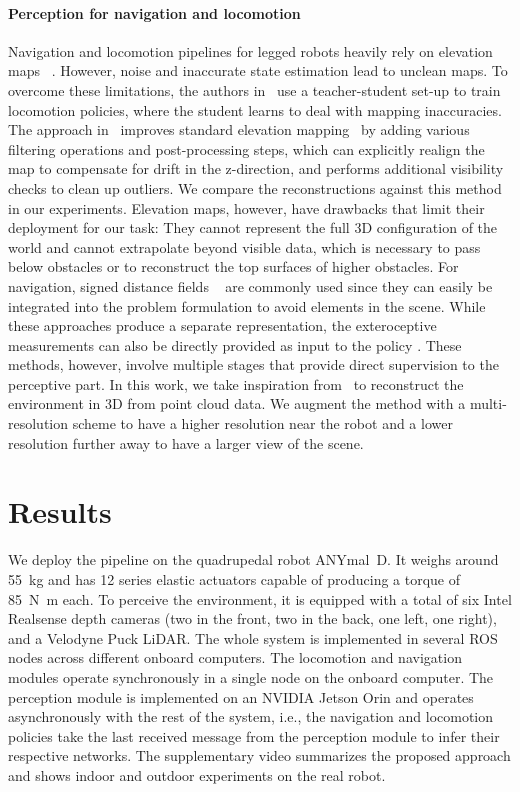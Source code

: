 \documentclass[conference]{IEEEtran}
\begin{document}
\paragraph{Perception for navigation and locomotion} 
Navigation and locomotion pipelines for legged robots heavily rely on elevation maps ~\cite{chavez2018traversability, bowen2021Navigation, miki2021locomotion, grandia2022perceptive, gangapurwala2020RLOCTL}. 
However, noise and inaccurate state estimation lead to unclean maps. To overcome these limitations, the authors in~\cite{miki2021locomotion} use a teacher-student set-up to train locomotion policies, where the student learns to deal with mapping inaccuracies. 
The approach in~\cite{miki2022EM} improves standard elevation mapping~\cite{Fankhauser2018ProbabilisticTerrainMapping} by adding various filtering operations and post-processing steps, which can explicitly realign the map to compensate for drift in the z-direction, and performs additional visibility checks to clean up outliers. We compare the reconstructions against this method in our experiments.
Elevation maps, however, have drawbacks that limit their deployment for our task: They cannot represent the full 3D configuration of the world and cannot extrapolate beyond visible data, which is necessary to pass below obstacles or to reconstruct the top surfaces of higher obstacles.
For navigation, signed distance fields ~\cite{oleynikova2017voxblox} are commonly used since they can easily be integrated into the problem formulation to avoid elements in the scene.
While these approaches produce a separate representation, the exteroceptive measurements can also be directly provided as input to the policy \cite{agarwal2022legged, loquercio2022learn}. These methods, however, involve multiple stages that provide direct supervision to the perceptive part.
In this work, we take inspiration from~\cite{hoeller2022TREP} to reconstruct the environment in 3D from point cloud data. We augment the method with a multi-resolution scheme to have a higher resolution near the robot and a lower resolution further away to have a larger view of the scene.
 
\section{Results}
We deploy the pipeline on the quadrupedal robot ANYmal~D. It weighs around \SI{55}{\kilo\gram} and has 12 series elastic actuators capable of producing a torque of \SI{85}{\newton\meter} each. To perceive the environment, it is equipped with a total of six Intel Realsense depth cameras (two in the front, two in the back, one left, one right), and a Velodyne Puck LiDAR. The whole system is implemented in several ROS nodes across different onboard computers. The locomotion and navigation modules operate synchronously in a single node on the onboard computer. The perception module is implemented on an NVIDIA Jetson Orin and operates asynchronously with the rest of the system, i.e., the navigation and locomotion policies take the last received message from the perception module to infer their respective networks. The supplementary video summarizes the proposed approach and shows indoor and outdoor experiments on the real robot.
\end{document}
